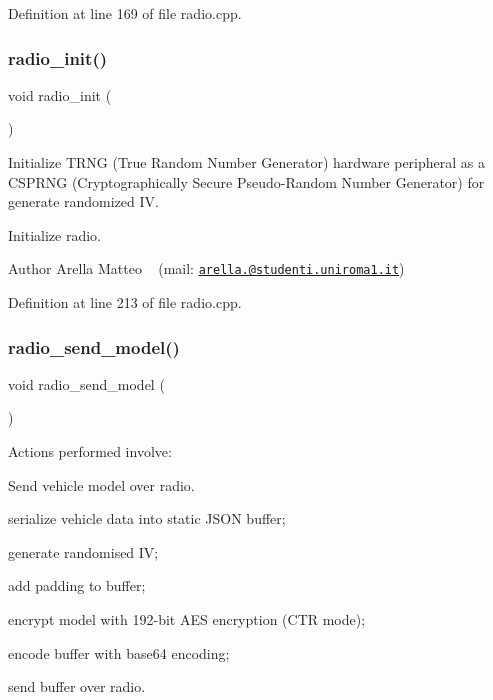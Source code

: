 Definition at line 169 of file radio.\+cpp.

\mbox{\label{group___radio__module_gaaf9aff6a522103cc312457043baf7eca}} 
\subsubsection{\texorpdfstring{radio\+\_\+init()}{radio\_init()}}
{\footnotesize\ttfamily void radio\+\_\+init (\begin{DoxyParamCaption}{ }\end{DoxyParamCaption})}



Initialize T\+R\+NG (True Random Number Generator) hardware peripheral as a C\+S\+P\+R\+NG (Cryptographically Secure Pseudo-\/\+Random Number Generator) for generate randomized IV. 

Initialize radio.

\begin{DoxyAuthor}{Author}
Arella Matteo ~\newline
 (mail\+: \href{mailto:arella.1646983@studenti.uniroma1.it}{\tt arella.@studenti.\+uniroma1.\+it}) 
\end{DoxyAuthor}


Definition at line 213 of file radio.\+cpp.

\mbox{\label{group___radio__module_ga5250a82de95a2d4e497dd1c580a92362}} 
\subsubsection{\texorpdfstring{radio\+\_\+send\+\_\+model()}{radio\_send\_model()}}
{\footnotesize\ttfamily void radio\+\_\+send\+\_\+model (\begin{DoxyParamCaption}{ }\end{DoxyParamCaption})}



Actions performed involve\+: 

Send vehicle model over radio.


\begin{DoxyItemize}
\item serialize vehicle data into static J\+S\+ON buffer;
\item generate randomised IV;
\item add padding to buffer;
\item encrypt model with 192-\/bit A\+ES encryption (C\+TR mode);
\item encode buffer with base64 encoding;
\item send buffer over radio.
\end{DoxyItemize}


